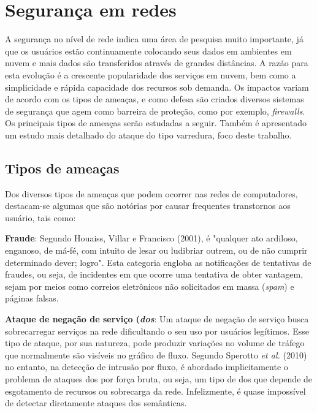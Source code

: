 \section{Segurança em redes}
\label{sec:seguranca}

A segurança no nível de rede indica uma área de pesquisa muito importante, já que os usuários estão continuamente colocando seus dados em ambientes em nuvem e mais dados são transferidos através de grandes distâncias. A razão para esta evolução é a crescente popularidade dos serviços em nuvem, bem como a simplicidade e rápida capacidade dos recursos sob demanda. Os impactos variam de acordo com os tipos de ameaças, e como defesa são criados diversos sistemas de segurança que agem como barreira de proteção, como por exemplo, \textit{firewalls}. Os principais tipos de ameaças serão estudadas a seguir. Também é apresentado um estudo mais detalhado do ataque do tipo varredura, foco deste trabalho.

\subsection{Tipos de ameaças}
Dos diversos tipos de ameaças que podem ocorrer nas redes de computadores, destacam-se algumas que são notórias por causar frequentes transtornos aos usuário, tais como:

\textbf{Fraude}:
Segundo Houaiss, Villar e Francisco (2001)\nocite{Houaiss:2001}, é "qualquer ato ardiloso, enganoso, de má-fé, com intuito de lesar ou ludibriar outrem, ou de não cumprir determinado dever; logro". Esta categoria engloba as notificações de tentativas de fraudes, ou seja, de incidentes em que ocorre uma tentativa de obter vantagem, sejam por meios como correios eletrônicos não solicitados em massa (\textit{spam}) e páginas falsas.
    
\textbf{Ataque de negação de serviço (\textit{\gls{dos}}}:
Um ataque de negação de serviço busca sobrecarregar serviços na rede dificultando o seu uso por usuários legítimos. Esse tipo de ataque, por sua natureza, pode produzir variações no volume de tráfego que normalmente são visíveis no gráfico de fluxo. Segundo Sperotto \textit{et al.} (2010)\nocite{Sperotto:2010} no entanto, na detecção de intrusão por fluxo, é abordado implicitamente o problema de ataques \gls{dos} por força bruta, ou seja, um tipo de \gls{dos} que depende de esgotamento de recursos ou sobrecarga da rede. Infelizmente, é quase impossível de detectar diretamente ataques \gls{dos} semânticas.
    
